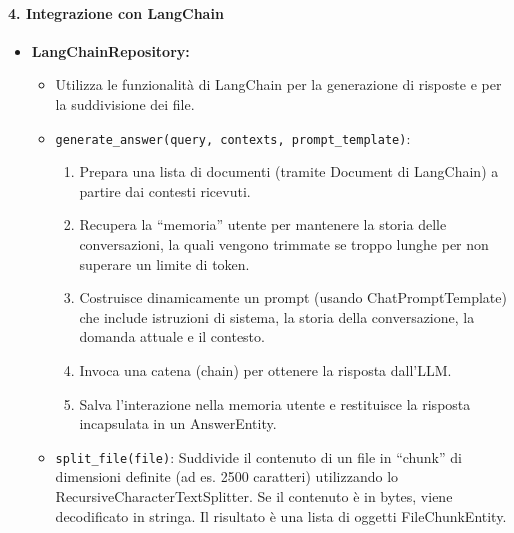     \paragraph{4. Integrazione con LangChain}
    \begin{itemize}
        \item \textbf{LangChainRepository:}
        \begin{itemize}
            \item Utilizza le funzionalità di LangChain per la generazione di risposte e per la suddivisione dei file.
            \item \texttt{generate\_answer(query, contexts, prompt\_template)}:
            \begin{enumerate}
                \item Prepara una lista di documenti (tramite Document di LangChain) a partire dai contesti ricevuti.
                \item Recupera la “memoria” utente per mantenere la storia delle conversazioni, la quali vengono trimmate se troppo lunghe per non superare un limite di token.
                \item Costruisce dinamicamente un prompt (usando ChatPromptTemplate) che include istruzioni di sistema, la storia della conversazione, la domanda attuale e il contesto.
                \item Invoca una catena (chain) per ottenere la risposta dall’LLM.
                \item Salva l’interazione nella memoria utente e restituisce la risposta incapsulata in un AnswerEntity.
            \end{enumerate}
            \item \texttt{split\_file(file)}: Suddivide il contenuto di un file in “chunk” di dimensioni definite (ad es. 2500 caratteri) utilizzando lo RecursiveCharacterTextSplitter. Se il contenuto è in bytes, viene decodificato in stringa. Il risultato è una lista di oggetti FileChunkEntity.
        \end{itemize}
    \end{itemize}

